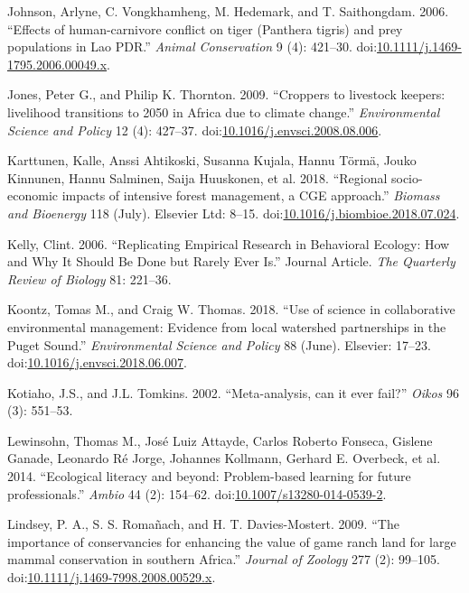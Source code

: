 \documentclass[fleqn,10pt]{wlpeerj} %
\begin{document}
\hypertarget{ref-Johnson2006}{}
Johnson, Arlyne, C. Vongkhamheng, M. Hedemark, and T. Saithongdam. 2006.
``Effects of human-carnivore conflict on tiger (Panthera tigris) and
prey populations in Lao PDR.'' \emph{Animal Conservation} 9 (4):
421--30.
doi:\href{https://doi.org/10.1111/j.1469-1795.2006.00049.x}{10.1111/j.1469-1795.2006.00049.x}.

\hypertarget{ref-Jones2009}{}
Jones, Peter G., and Philip K. Thornton. 2009. ``Croppers to livestock
keepers: livelihood transitions to 2050 in Africa due to climate
change.'' \emph{Environmental Science and Policy} 12 (4): 427--37.
doi:\href{https://doi.org/10.1016/j.envsci.2008.08.006}{10.1016/j.envsci.2008.08.006}.

\hypertarget{ref-Karttunen2018}{}
Karttunen, Kalle, Anssi Ahtikoski, Susanna Kujala, Hannu Törmä, Jouko
Kinnunen, Hannu Salminen, Saija Huuskonen, et al. 2018. ``Regional
socio-economic impacts of intensive forest management, a CGE approach.''
\emph{Biomass and Bioenergy} 118 (July). Elsevier Ltd: 8--15.
doi:\href{https://doi.org/10.1016/j.biombioe.2018.07.024}{10.1016/j.biombioe.2018.07.024}.

\hypertarget{ref-Kelly2006}{}
Kelly, Clint. 2006. ``Replicating Empirical Research in Behavioral
Ecology: How and Why It Should Be Done but Rarely Ever Is.'' Journal
Article. \emph{The Quarterly Review of Biology} 81: 221--36.

\hypertarget{ref-Koontz2018}{}
Koontz, Tomas M., and Craig W. Thomas. 2018. ``Use of science in
collaborative environmental management: Evidence from local watershed
partnerships in the Puget Sound.'' \emph{Environmental Science and
Policy} 88 (June). Elsevier: 17--23.
doi:\href{https://doi.org/10.1016/j.envsci.2018.06.007}{10.1016/j.envsci.2018.06.007}.

\hypertarget{ref-Kotiaho2002}{}
Kotiaho, J.S., and J.L. Tomkins. 2002. ``Meta-analysis, can it ever
fail?'' \emph{Oikos} 96 (3): 551--53.

\hypertarget{ref-Lewinsohn2014}{}
Lewinsohn, Thomas M., José Luiz Attayde, Carlos Roberto Fonseca, Gislene
Ganade, Leonardo Ré Jorge, Johannes Kollmann, Gerhard E. Overbeck, et
al. 2014. ``Ecological literacy and beyond: Problem-based learning for
future professionals.'' \emph{Ambio} 44 (2): 154--62.
doi:\href{https://doi.org/10.1007/s13280-014-0539-2}{10.1007/s13280-014-0539-2}.

\hypertarget{ref-Lindsey2009}{}
Lindsey, P. A., S. S. Romañach, and H. T. Davies-Mostert. 2009. ``The
importance of conservancies for enhancing the value of game ranch land
for large mammal conservation in southern Africa.'' \emph{Journal of
Zoology} 277 (2): 99--105.
doi:\href{https://doi.org/10.1111/j.1469-7998.2008.00529.x}{10.1111/j.1469-7998.2008.00529.x}.
\end{document}
